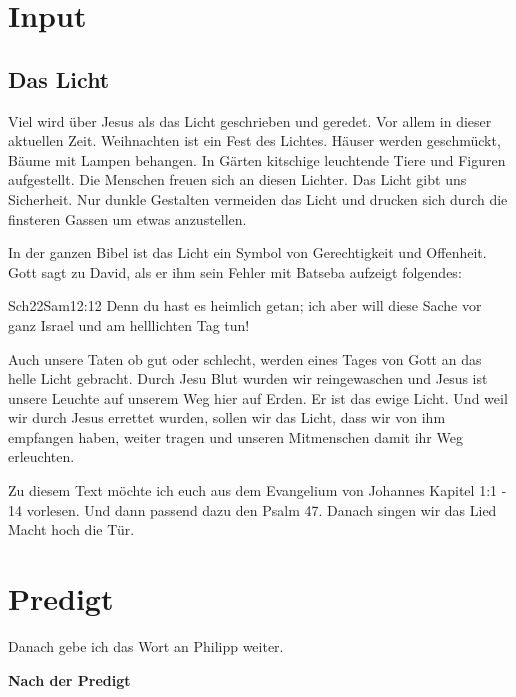 \documentclass{../inc/mybib}
\begin{document}
\section{ Input }
\begin{spacing}{1.5}
\subsection{ Das Licht }

Viel wird über Jesus als das Licht geschrieben und geredet. Vor allem in dieser aktuellen Zeit. Weihnachten ist ein Fest des Lichtes. Häuser werden geschmückt, Bäume mit Lampen behangen. In Gärten kitschige leuchtende Tiere und Figuren aufgestellt. Die Menschen freuen sich an diesen Lichter. Das Licht gibt uns Sicherheit. Nur dunkle Gestalten vermeiden das Licht und drucken sich durch die finsteren Gassen um etwas anzustellen. 

In der ganzen Bibel ist das Licht ein Symbol von Gerechtigkeit und Offenheit. Gott sagt zu David, als er ihm sein Fehler mit Batseba aufzeigt folgendes:

\begin{bibeltext}{Sch2}{2Sam}{12:12}
Denn du hast es heimlich getan; ich aber will diese Sache vor ganz Israel und am helllichten Tag tun!
\end{bibeltext}

Auch unsere Taten ob gut oder schlecht, werden eines Tages von Gott an das helle Licht gebracht.
Durch Jesu Blut wurden wir reingewaschen und Jesus ist unsere Leuchte auf unserem Weg hier auf Erden. Er ist das ewige Licht. Und weil wir durch Jesus errettet wurden, sollen wir das Licht, dass wir von ihm empfangen haben, weiter tragen und unseren Mitmenschen damit ihr Weg erleuchten.

Zu diesem Text möchte ich euch aus dem Evangelium von Johannes Kapitel 1:1 - 14 vorlesen.
Und dann passend dazu den Psalm 47. Danach singen wir das Lied Macht hoch die Tür.

\end{spacing}


\section{Predigt}

Danach gebe ich das Wort an Philipp weiter.

\textbf{Nach der Predigt}
\end{document}
